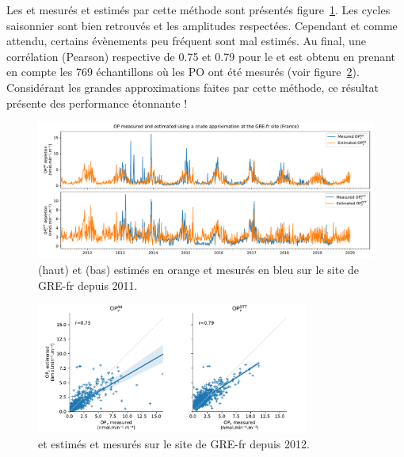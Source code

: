 Les \POAAv{} et \PODTTv{} mesurés et estimés par cette méthode sont présentés figure~\ref{fig:OPGRE-fr-estimated}.
Les cycles saisonnier sont bien retrouvés et les amplitudes respectées. Cependant et comme attendu, certains évènements peu fréquent sont mal estimés. Au final, une corrélation (Pearson) respective de 0.75 et 0.79 pour le \POAAv{} et \PODTTv{} est obtenu en prenant en compte les 769 échantillons où les PO ont été mesurés (voir figure~\ref{fig:OPGRE-fr-estimated_scatter}).
Considérant les grandes approximations faites par cette méthode, ce résultat présente des performance étonnante !

\begin{figure}[ht]
    \centering
    \includegraphics[width=1.0\textwidth]{figures/chapter05/OPGRE-fr_estimated.pdf}
    \caption{\POAAv{} (haut) et \PODTTv{} (bas) estimés en orange et mesurés en bleu sur le site de GRE-fr depuis 2011.}
    \label{fig:OPGRE-fr-estimated}
\end{figure}
 
\begin{figure}[ht]
    \centering
    \includegraphics[width=0.8\textwidth]{figures/chapter05/OPGRE-fr_estimated_scatter.pdf}
    \caption{\POAAv{} et \PODTTv{} estimés et mesurés sur le site de GRE-fr depuis 2012.}
    \label{fig:OPGRE-fr-estimated_scatter}
\end{figure}


